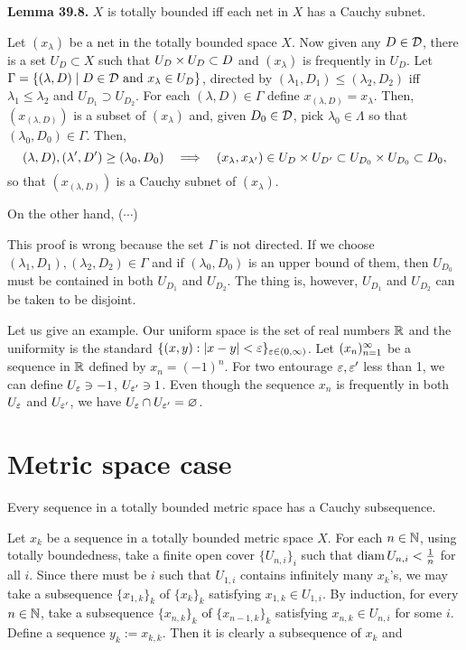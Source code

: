 \documentclass{../exp}
\begin{document}
\noindent\textbf{Lemma 39.8.}
$X$ is totally bounded iff each net in $X$ has a Cauchy subnet.
\begin{pf}
Let $(x_\lambda)$ be a net in the totally bounded space $X$.
Now given any $D\in\mathcal{D}$, there is a set $U_D\subset X$ such that $U_D\times U_D\subset D$ and $(x_\lambda)$ is frequently in $U_D$.
Let $\Gamma=\{(\lambda,D)\mid D\in\mathcal{D}\text{ and }x_\lambda\in U_D\}$, directed by $(\lambda_1,D_1)\le(\lambda_2,D_2)$ iff $\lambda_1\le\lambda_2$ and $U_{D_1}\supset U_{D_2}$.
For each $(\lambda,D)\in\Gamma$ define $x_{(\lambda,D)}=x_\lambda$.
Then, $(x_{(\lambda,D)})$ is a subset of $(x_\lambda)$ and, given $D_0\in\mathcal{D}$, pick $\lambda_0\in\Lambda$ so that $(\lambda_0,D_0)\in\Gamma$.
Then,
\[(\lambda,D),(\lambda',D')\ge(\lambda_0,D_0)\impl(x_\lambda,x_{\lambda'})\in U_D\x U_{D'}\subset U_{D_0}\x U_{D_0}\subset D_0,\]
so that $(x_{(\lambda,D)})$ is a Cauchy subnet of $(x_\lambda)$.

On the other hand, ($\cdots$)
\end{pf}
\bigskip
This proof is wrong because the set $\Gamma$ is not directed.
If we choose $(\lambda_1,D_1),(\lambda_2,D_2)\in\Gamma$ and if $(\lambda_0,D_0)$ is an upper bound of them, then $U_{D_0}$ must be contained in both $U_{D_1}$ and $U_{D_2}$.
The thing is, however, $U_{D_1}$ and $U_{D_2}$ can be taken to be disjoint.

Let us give an example.
Our uniform space is the set of real numbers $\mathbb{R}$ and the uniformity is the standard $\{(x,y):|x-y|<\varepsilon\}_{\varepsilon\in(0,\infty)}$.
Let $(x_n)_{n=1}^\infty$ be a sequence in $\mathbb{R}$ defined by $x_n=(-1)^n$.
For two entourage $\varepsilon,\varepsilon'$ less than 1, we can define $U_\varepsilon\ni-1$, $U_{\varepsilon'}\ni1$.
Even though the sequence $x_n$ is frequently in both $U_\varepsilon$ and $U_{\varepsilon'}$, we have $U_\varepsilon\cap U_{\varepsilon'}=\varnothing$.





\section{Metric space case}

\begin{thm}
Every sequence in a totally bounded metric space has a Cauchy subsequence.
\end{thm}
\begin{pf}
Let $x_k$ be a sequence in a totally bounded metric space $X$.
For each $n\in\mathbb{N}$, using totally boundedness, take a finite open cover $\{U_{n,i}\}_i$ such that $\operatorname{diam} U_{n,i}<\frac1n$ for all $i$.
Since there must be $i$ such that $U_{1,i}$ contains infinitely many $x_k$'s, we may take a subsequence $\{x_{1,k}\}_k$ of $\{x_k\}_k$ satisfying $x_{1,k}\in U_{1,i}$.
By induction, for every $n\in\mathbb{N}$, take a subsequence $\{x_{n,k}\}_k$ of $\{x_{n-1,k}\}_k$ satisfying $x_{n,k}\in U_{n,i}$ for some $i$.
Define a sequence $y_k:=x_{k,k}$.
Then it is clearly a subsequence of $x_k$ and
\end{pf}
\end{document}

